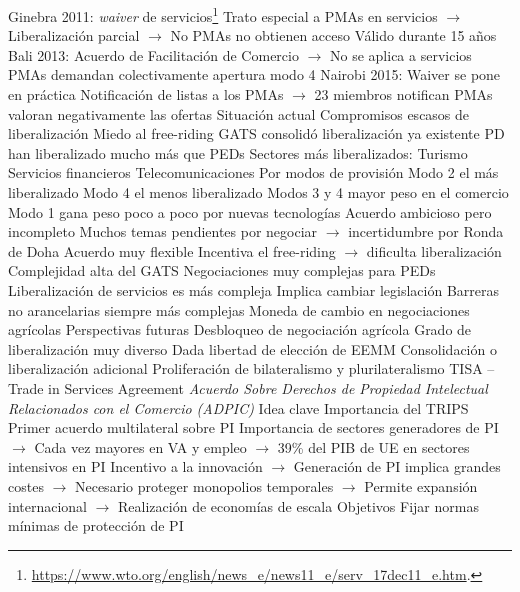 \documentclass{nuevotema}
\begin{document}
\begin{esquemal}
				\4 Ginebra 2011:
				\4[] \textit{waiver} de servicios\footnote{\url{https://www.wto.org/english/news_e/news11_e/serv_17dec11_e.htm}.}
				\4[] Trato especial a PMAs en servicios
				\4[] $\to$ Liberalización parcial
				\4[] $\to$ No PMAs no obtienen acceso
				\4[] Válido durante 15 años
				\4 Bali 2013:
				\4[] Acuerdo de Facilitación de Comercio
				\4[] $\to$ No se aplica a servicios
				\4[] PMAs demandan colectivamente apertura modo 4
				\4 Nairobi 2015:
				\4[] Waiver se pone en práctica
				\4[] Notificación de listas a los PMAs
				\4[] $\to$ 23 miembros notifican
				\4[] PMAs valoran negativamente las ofertas
			\3 Situación actual
				\4 Compromisos escasos de liberalización
				\4 Miedo al free-riding
				\4 GATS consolidó liberalización ya existente
				\4 PD han liberalizado mucho más que PEDs
				\4 Sectores más liberalizados:
				\4[] Turismo
				\4[] Servicios financieros
				\4[] Telecomunicaciones
				\4 Por modos de provisión
				\4[] Modo 2 el más liberalizado
				\4[] Modo 4 el menos liberalizado
				\4[] Modos 3 y 4 mayor peso en el comercio
				\4[] Modo 1 gana peso poco a poco por nuevas tecnologías
				\4 Acuerdo ambicioso pero incompleto
				\4[] Muchos temas pendientes por negociar
				\4[] $\to$ incertidumbre por Ronda de Doha
				\4 Acuerdo muy flexible
				\4 Incentiva el free-riding
				\4[] $\to$ dificulta liberalización
				\4 Complejidad alta del GATS
				\4[$\to$] Negociaciones muy complejas para PEDs
				\4 Liberalización de servicios es más compleja
				\4[] Implica cambiar legislación
				\4[] Barreras no arancelarias siempre más complejas
				\4 Moneda de cambio en negociaciones agrícolas
			\3 Perspectivas futuras
				\4 Desbloqueo de negociación agrícola
				\4 Grado de liberalización muy diverso
				\4[] Dada libertad de elección de EEMM
				\4[] Consolidación o liberalización adicional
				\4 Proliferación de bilateralismo y plurilateralismo
				\4 TISA -- Trade in Services Agreement
	\1  \textit{Acuerdo Sobre Derechos de Propiedad Intelectual Relacionados con el Comercio (ADPIC)}
		\2 Idea clave
			\3 Importancia del TRIPS
				\4 Primer acuerdo multilateral sobre PI
				\4 Importancia de sectores generadores de PI
				\4[] $\to$ Cada vez mayores en VA y empleo
				\4[] $\to$ 39\% del PIB de UE en sectores intensivos en PI
				\4 Incentivo a la innovación
				\4[] $\to$ Generación de PI implica grandes costes
				\4[] $\to$ Necesario proteger monopolios temporales
				\4[] $\to$ Permite expansión internacional
				\4[] $\to$ Realización de economías de escala
			\3 Objetivos
				\4 Fijar normas mínimas de protección de PI

\end{esquemal}
\end{document}
